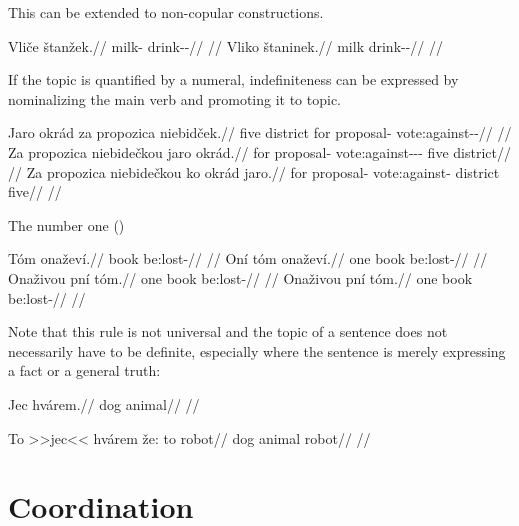 This can be extended to non-copular constructions.

\begin{multicols}{2}
  \pex
  \a
  \begingl
  \gla Vliče štanžek.//
  \glb milk-\Gen{} drink-\Av{}-\Pf{}//
  \glft {}//
  \endgl
  \a
  \begingl
  \gla Vliko štaninek.//
  \glb milk drink-\Pv{}-\Pf{}//
  \glft {}//
  \endgl
  \xe
\end{multicols}

If the topic is quantified by a numeral,
indefiniteness can be expressed by nominalizing the main
verb and promoting it to topic.

\pex
\a
\begingl
\gla Jaro okrád za propozica niebidček.// \glb five district for proposal-\Acc{}
vote:against-\Av{}-\Pf{}// \glft {}//
\endgl
\a
\begingl
\gla Za propozica niebidečkou jaro okrád.// \glb for proposal-\Acc{}
vote:against-\Av{}-\Pf{}-\Nz{} five district// \glft {}//
\endgl
\a
\begingl
\gla Za propozica niebidečkou ko okrád jaro.// \glb for proposal-\Acc{}
vote:against-  district five// \glft {}//
\endgl
\xe

The number one ()

\pex
\a
\begingl
\gla Tóm onaževí.//
\glb book be:lost-//
\glft {}//
\endgl
\a
\begingl
\gla Oní tóm onaževí.//
\glb one book be:lost-//
\glft {}//
\endgl
\a
\begingl
\gla Onaživou pní tóm.//
\glb one book be:lost-//
\glft {}//
\endgl
\a
\begingl
\gla Onaživou pní tóm.//
\glb one book be:lost-//
\glft {}//
\endgl
\xe


Note that this rule is not universal and the topic of a sentence does not necessarily have to be definite, especially where the sentence is merely expressing a fact or a general truth:

\pex
\begingl
\gla Jec hvárem.//
\glb dog animal//
\glft {}//
\endgl
\xe



\pex
\begingl
\gla To >>jec<< hvárem že: to robot//
\glb \Dem{} dog animal  \Dem{} robot//
\glft {}//
\endgl
\xe


\section{Coordination} 

